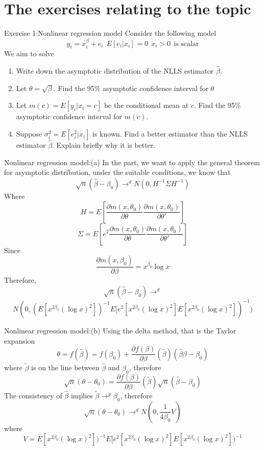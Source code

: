 \documentclass{beamer}
\begin{document}
\section{The exercises relating to the topic}
\begin{frame}{Exercise 1:Nonlinear regression model}
	Consider the following model
	\[y_i = x^{\beta}_i + e_i \ \ E[e_i|x_i]=0 \ \ x_i >0 \ \ \text{is scalar}\]
	We aim to solve 
	\begin{enumerate}
		\item Write down the asymptotic distribution of the NLLS estimator $\hat{\beta}$.
		\item Let $\theta = \sqrt{\beta}$. Find the 95\% asymptotic confidence interval for $\theta$
		\item Let $m(c) = E[y_i|x_i=c]$ be the conditional mean at $c$. Find the 95\% asymptotic confidence interval for $m(c)$.
		\item Suppose $\sigma^2_i = E[e^2_i|x_i]$ is known. Find a better estimator than the NLLS estimator $\hat{\beta}$. Explain briefly why it is better.
	\end{enumerate}
\end{frame}
\begin{frame}{Nonlinear regression model:(a)}
	In the part, we want to apply the general theorem for asymptotic distribution, under the suitable conditions, we know that 
	\[\sqrt{n}(\hat{\beta} - \beta_0) \rightarrow^d N(0,H^{-1} \Sigma H^{-1})\]
	Where
	\[H = E[\frac{\partial m(x,\theta_0)}{\partial \theta} \frac{\partial m(x, \theta_0)}{ \partial \theta'}]\]
	\[\Sigma = E[e^2 \frac{\partial m(x,\theta_0)}{\partial \theta} \frac{\partial m(x, \theta_0)}{ \partial \theta'}]\]
	Since 
	\[\frac{\partial m(x,\beta_0)}{\partial \beta} = x^{\beta_0} \log x\]
	Therefore,
\[\sqrt{n}(\hat{\beta} - \beta_0) \rightarrow^d \]
\[ N(0, (E[x^{2\beta_0} (\log x)^2])^{-1} E[e^2[x^{2\beta_0} (\log x)^2] E[x^{2\beta_0} (\log x)^2])^{-1})\]

\end{frame}
\begin{frame}{Nonlinear regression model:(b)}
	Using the delta method, that is the Taylor expansion
	\[\theta = f(\hat{\beta}) = f(\beta_0) + \frac{\partial f(\beta)}{\partial \beta}(\tilde{\beta}) (\hat{\beta}\beta - \beta_0)\]
	where $\tilde{\beta}$ is on the line between $\hat{\beta}$ and $\beta_0$, therefore
	\[\sqrt{n}(\theta - \theta_0) = \frac{\partial f(\beta)}{\partial \beta}(\tilde{\beta}) \sqrt{n}(\hat{\beta} - \beta_0)\]
	The consistency of $\hat{\beta}$ implies $\tilde{\beta} \rightarrow^p \beta_0$, therefore
	\[\sqrt{n}(\theta - \theta_0) \rightarrow^d N(0,\frac{1}{4\beta_0} V)\]
	where
\[V = E[x^{2\beta_0} (\log x)^2])^{-1} E[e^2[x^{2\beta_0} (\log x)^2] E[x^{2\beta_0} (\log x)^2])^{-1}\]
\end{frame}
\end{document}
